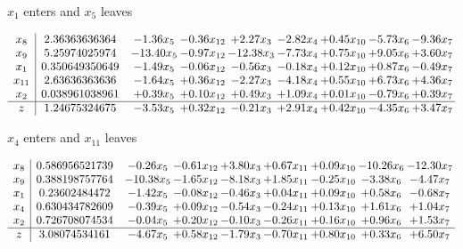 \documentclass[8pt]{article}
\begin{document}
 $ x_{1} $ enters and $ x_{5} $ leaves 

 \[\begin{array}{c| c c@{\hskip 2pt} c@{\hskip 2pt} c@{\hskip 2pt} c@{\hskip 2pt} c@{\hskip 2pt} c@{\hskip 2pt} c@{\hskip 2pt} }
 x_{8}   &  2.36363636364 & -1.36 x_{5} & -0.36 x_{12} & +  2.27 x_{3} & -2.82 x_{4} & +  0.45 x_{10} & -5.73 x_{6} & -9.36 x_{7}\\
 x_{9}   &  5.25974025974 & -13.40 x_{5} & -0.97 x_{12} & -12.38 x_{3} & -7.73 x_{4} & +  0.75 x_{10} & +  9.05 x_{6} & +  3.60 x_{7}\\
 x_{1}   &  0.350649350649 & -1.49 x_{5} & -0.06 x_{12} & -0.56 x_{3} & -0.18 x_{4} & +  0.12 x_{10} & +  0.87 x_{6} & -0.49 x_{7}\\
 x_{11}   &  2.63636363636 & -1.64 x_{5} & +  0.36 x_{12} & -2.27 x_{3} & -4.18 x_{4} & +  0.55 x_{10} & +  6.73 x_{6} & +  4.36 x_{7}\\
 x_{2}   &  0.038961038961 & +  0.39 x_{5} & +  0.10 x_{12} & +  0.49 x_{3} & +  1.09 x_{4} & +  0.01 x_{10} & -0.79 x_{6} & +  0.39 x_{7}\\
\hline
z    &  1.24675324675 & -3.53 x_{5} & +  0.32 x_{12} & -0.21 x_{3} & +  2.91 x_{4} & +  0.42 x_{10} & -4.35 x_{6} & +  3.47 x_{7}\\
\end{array}\]


 $ x_{4} $ enters and $ x_{11} $ leaves 

 \[\begin{array}{c| c c@{\hskip 2pt} c@{\hskip 2pt} c@{\hskip 2pt} c@{\hskip 2pt} c@{\hskip 2pt} c@{\hskip 2pt} c@{\hskip 2pt} }
 x_{8}   &  0.586956521739 & -0.26 x_{5} & -0.61 x_{12} & +  3.80 x_{3} & +  0.67 x_{11} & +  0.09 x_{10} & -10.26 x_{6} & -12.30 x_{7}\\
 x_{9}   &  0.388198757764 & -10.38 x_{5} & -1.65 x_{12} & -8.18 x_{3} & +  1.85 x_{11} & -0.25 x_{10} & -3.38 x_{6} & -4.47 x_{7}\\
 x_{1}   &  0.23602484472 & -1.42 x_{5} & -0.08 x_{12} & -0.46 x_{3} & +  0.04 x_{11} & +  0.09 x_{10} & +  0.58 x_{6} & -0.68 x_{7}\\
 x_{4}   &  0.630434782609 & -0.39 x_{5} & +  0.09 x_{12} & -0.54 x_{3} & -0.24 x_{11} & +  0.13 x_{10} & +  1.61 x_{6} & +  1.04 x_{7}\\
 x_{2}   &  0.726708074534 & -0.04 x_{5} & +  0.20 x_{12} & -0.10 x_{3} & -0.26 x_{11} & +  0.16 x_{10} & +  0.96 x_{6} & +  1.53 x_{7}\\
\hline
z    &  3.08074534161 & -4.67 x_{5} & +  0.58 x_{12} & -1.79 x_{3} & -0.70 x_{11} & +  0.80 x_{10} & +  0.33 x_{6} & +  6.50 x_{7}\\
\end{array}\]
\end{document}
